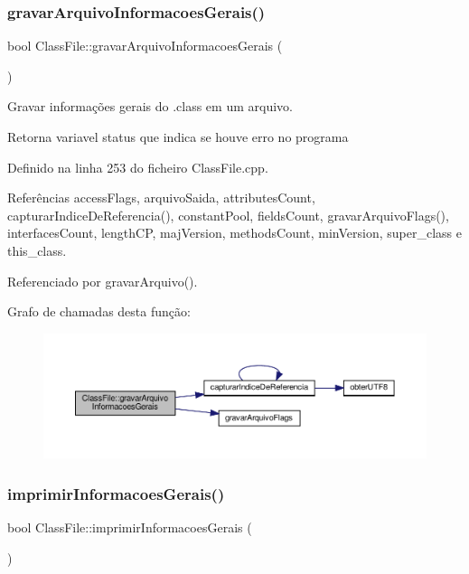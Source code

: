 \subsubsection{\texorpdfstring{gravar\+Arquivo\+Informacoes\+Gerais()}{gravarArquivoInformacoesGerais()}}
{\footnotesize\ttfamily bool Class\+File\+::gravar\+Arquivo\+Informacoes\+Gerais (\begin{DoxyParamCaption}{ }\end{DoxyParamCaption})}



Gravar informações gerais do .class em um arquivo. 

\begin{DoxyReturn}{Retorna}
variavel status que indica se houve erro no programa 
\end{DoxyReturn}


Definido na linha 253 do ficheiro Class\+File.\+cpp.



Referências access\+Flags, arquivo\+Saida, attributes\+Count, capturar\+Indice\+De\+Referencia(), constant\+Pool, fields\+Count, gravar\+Arquivo\+Flags(), interfaces\+Count, length\+CP, maj\+Version, methods\+Count, min\+Version, super\+\_\+class e this\+\_\+class.



Referenciado por gravar\+Arquivo().

Grafo de chamadas desta função\+:
\nopagebreak
\begin{figure}[H]
\begin{center}
\leavevmode
\includegraphics[width=350pt]{classClassFile_a4a685afd10dc5aaacd5a71ed535895c6_cgraph}
\end{center}
\end{figure}
\mbox{\label{classClassFile_a482ed64fcd8a1b79d3622b3f59b5767a}} 
\subsubsection{\texorpdfstring{imprimir\+Informacoes\+Gerais()}{imprimirInformacoesGerais()}}
{\footnotesize\ttfamily bool Class\+File\+::imprimir\+Informacoes\+Gerais (\begin{DoxyParamCaption}{ }\end{DoxyParamCaption})}



